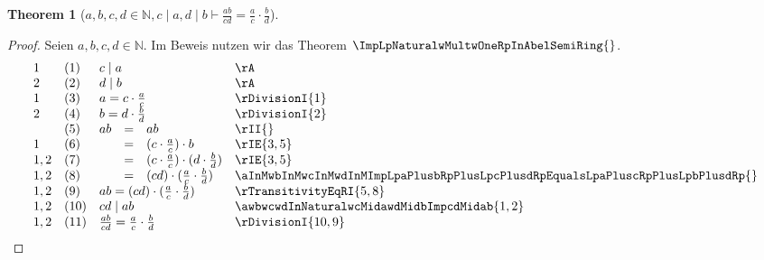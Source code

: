 \documentclass{book}
\theoremstyle{plain}
\newtheorem{theorem}{Theorem}
\theoremstyle{remark}
\theoremstyle{definition}
\begin{document}
\label{awbwcwdInNaturalwcMidawdMidbImpLpabRpDurchLpcdRpEqualsLpaRpDurchLpcRpMultLpbRpDurchLpdRp}
\begin{theorem}[\(a,b,c,d\in\mathbb{N},c\mid a, d\mid b\vdash \frac{ab}{cd}=\frac{a}{c}\cdot\frac{b}{d}\)]
\end{theorem}
\begin{proof}
Seien \(a,b,c,d\in\mathbb{N}\).
Im Beweis nutzen wir das Theorem \(\ImpLpNaturalwMultwOneRpInAbelSemiRing{}\). 
    \[
	\begin{array}{llclll}
    1       &  (1)  & \multicolumn{3}{l}{c\mid a} & \rA \\
    2       &  (2)  & \multicolumn{3}{l}{d\mid b} & \rA \\
    1       &  (3)  & \multicolumn{3}{l}{a=c\cdot \frac{a}{c}} & \rDivisionI{1} \\
    2       &  (4)  & \multicolumn{3}{l}{b=d\cdot \frac{b}{d}} & \rDivisionI{2} \\
            &  (5)  & ab&=&ab & \rII{} \\
    1       &  (6)  & &=&(c\cdot \frac{a}{c})\cdot b & \rIE{3,5} \\
    1,2     &  (7)  & &=&(c\cdot \frac{a}{c})\cdot (d\cdot \frac{b}{d}) & \rIE{3,5} \\
    1,2       &  (8)  & &=&(cd)\cdot (\frac{a}{c}\cdot \frac{b}{d}) & \aInMwbInMwcInMwdInMImpLpaPlusbRpPlusLpcPlusdRpEqualsLpaPluscRpPlusLpbPlusdRp{} \\
    1,2       &  (9) &\multicolumn{3}{l}{ab=(cd)\cdot (\frac{a}{c}\cdot \frac{b}{d})} & \rTransitivityEqRI{5,8} \\
    1,2       &  (10)  & \multicolumn{3}{l}{cd\mid ab} & \awbwcwdInNaturalwcMidawdMidbImpcdMidab{1,2} \\
    1,2       &  (11)  & \multicolumn{3}{l}{\frac{ab}{cd}=\frac{a}{c}\cdot\frac{b}{d}} & \rDivisionI{10,9} \\
    \end{array}
	\]
\end{proof}
\end{document}
